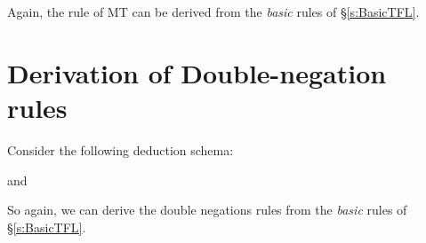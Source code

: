 \begin{fitchproof}
		\open
		\close
\end{fitchproof}
Again, the rule of MT can be derived from the \emph{basic} rules of \S\ref{s:BasicTFL}.



\section{Derivation of Double-negation rules}
Consider the following deduction schema:

\begin{fitchproof}
	\open
	\close
{}
\end{fitchproof}
and

\begin{fitchproof}
	\open
	\close
{}
\end{fitchproof}
So again,  we can derive the double negations rules from the \emph{basic} rules of \S\ref{s:BasicTFL}.




%
%
%
%

